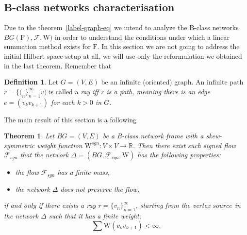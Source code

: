 \documentclass[12pt]{article}
\newtheorem{theorem}{Theorem}
\theoremstyle{definition}
\newtheorem{definition}{Definition}
\newcommand{\seq}[1]{\{{#1}_n\}_{n=1}^\infty}
\newcommand{\fsys}{\mathrm{F}}
\newcommand{\sgnwt}{\mathrm{W}^{sgn}}
\newcommand{\wt}{\mathrm{W}}
\newcommand{\flow}{\mathcal{F}}
\newcommand{\flowsgn}{\mathcal{F}_{sgn}}
\newcommand{\source}{\mathit{source}}
\newcommand{\net}{\Delta}
\numberwithin{remark}{section}
\numberwithin{theorem}{section}
\numberwithin{prop}{section}
\numberwithin{equation}{section}
\numberwithin{lemma}{section}
\numberwithin{prop_under_lemma}{lemma}
\begin{document}
    \subsection{B-class networks characterisation}
    Due to the theorem~\ref{label-graph-eq} we intend to analyze the B-class networks
    $BG(\fsys), \flow, \wt)$ in order to understand the conditions under which a linear
    summation method exists for $\fsys$.
    In this section we are not going to address the initial Hilbert space setup at all,
    we will use only the reformulation we obtained in the last theorem.
    Remember that
    \begin{definition}
      Let $G = (V, E)$ be an infinite (oriented) graph.
      An infinite path $r = \seq(v)$ is called a \it{ray} iff
      $r$ is a path, meaning there is an edge $e = (v_k v_{k+1})$ for each $k > 0$ in $G$.
    \end{definition}
    The main result of this section is a following
    \begin{theorem}
      Let $BG = (V, E)$ be a B-class network frame with a skew-symmetric weight function $\sgnwt : V \times V \to \mathbb{R}$.
      Then there exist such signed flow $\flowsgn$ that the network $\net = (BG, \flowsgn, \wt)$ has the following properties:
      \begin{itemize}
        \item the flow $\flowsgn$ has a finite mass,
        \item the network $\net$ does not preserve the flow,
      \end{itemize}
      if and only if there exists a ray $r = \seq{v}$, starting from the vertex $\source$
        in the network $\net$ such that it has a finite weight:
      $$
        \sum \wt(v_k v_{k+1}) < \infty.
      $$
    \end{theorem}
\end{document}
